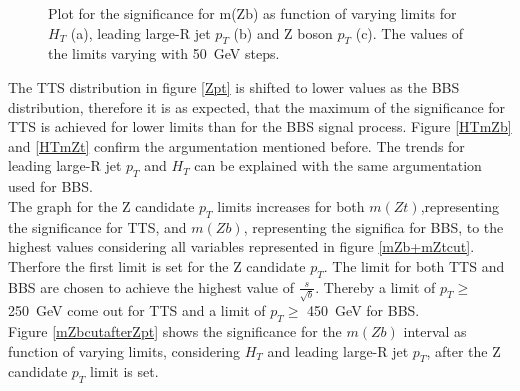 \begin{figure}[h]
    \centering
    \centering
    \centering
    \caption{Plot for the significance for m(Zb) as function of varying limits for $H_{T}$ (a), leading large-R jet $p_{T}$ (b) and Z boson $p_{T}$ (c).
    The values of the limits varying with \SI{50}{GeV} steps.}
    \label{mZtcut}   
\end{figure}
    



The TTS distribution in figure \ref{Zpt} is shifted to lower values as the BBS distribution, therefore it is as expected, that the maximum of the significance for TTS is achieved for lower limits than for the BBS signal process.
Figure \ref{HTmZb} and \ref{HTmZt} confirm the argumentation mentioned before.
The trends for leading large-R jet $p_{T}$ and $H_{T}$ can be explained with the same argumentation used for BBS.\\
The graph for the Z candidate $p_{T}$ limits increases for both $m(Zt)$,representing the significance for TTS, and $m(Zb)$, representing the significa for BBS, to the highest values considering all variables represented in figure \ref{mZb+mZtcut}.
Therfore the first limit is set for the Z candidate $p_{T}$.
The limit for both TTS and BBS are chosen to achieve the highest value of $\frac{s}{\sqrt{b}}$.
Thereby a limit of $p_{T} \geq$ \SI{250}{GeV} come out for TTS and a limit of $p_{T} \geq$ \SI{450}{GeV} for BBS. \\
Figure \ref{mZbcutafterZpt} shows the significance for the $m(Zb)$ interval as function of varying limits, considering $H_{T}$ and leading large-R jet $p_{T}$, after the Z candidate $p_{T}$ limit is set.

